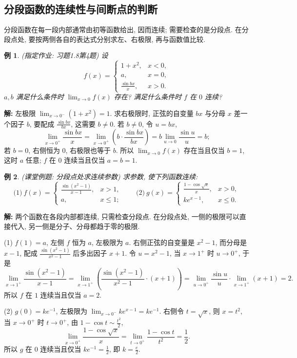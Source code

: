 \documentclass[UTF8,openany]{ctexbook}
\theoremstyle{chinesetextbook}
\newtheorem{example}{例}[section]
\newenvironment{cnsolution}{\par\indent\textbf{解:} \ignorespaces}{\par}
\begin{document}
\subsection{分段函数的连续性与间断点的判断}
分段函数在每一段内部通常由初等函数给出, 因而连续; 需要检查的是分段点. 在分段点处, 要按两侧各自的表达式分别求左、右极限, 再与函数值比较.
\begin{example}
\textnormal{(指定作业: 习题1.8第4题)} 设
\[
f(x)=\begin{cases}1+x^2,&x<0,\\a,&x=0,\\\frac{\sin bx}x,&x>0.\end{cases}
\]
$a,b$ 满足什么条件时 $\displaystyle\lim_{x\to0}f(x)$ 存在? 满足什么条件时 $f$ 在 $0$ 连续?
\end{example}
\begin{cnsolution}
左极限 $\displaystyle\lim_{x\to0^-}(1+x^2)=1$. 求右极限时, 正弦的自变量 $bx$ 与分母 $x$ 差一个因子 $b$, 要配成 $\displaystyle\frac{\sin bx}{bx}$, 这需要 $b\ne0$. 若 $b\ne0$, 令 $u=bx$,
\[
\lim_{x\to0^+}\frac{\sin bx}x=\lim_{x\to0^+}\left(b\cdot\frac{\sin bx}{bx}\right)=b\lim_{u\to0}\frac{\sin u}u=b;
\]
若 $b=0$, 右侧恒为 $0$, 右极限也等于 $b$. 所以 $\displaystyle\lim_{x\to0}f(x)$ 存在当且仅当 $b=1$, 这时 $a$ 任意; $f$ 在 $0$ 连续当且仅当 $a=b=1$.
\end{cnsolution}
\begin{example}
\textnormal{(课堂例题: 分段点处求连续参数)} 求参数, 使下列函数连续:
\[
\text{(1)}\ f(x)=\begin{cases}\frac{\sin(x^2-1)}{x-1},&x>1,\\a,&x\le1;\end{cases}\qquad\text{(2)}\ g(x)=\begin{cases}\frac{1-\cos\sqrt x}x,&x>0,\\ke^{x-1},&x\le0.\end{cases}
\]
\end{example}
\begin{cnsolution}
两个函数在各段内部都连续, 只需检查分段点. 在分段点处, 一侧的极限可以直接代入, 另一侧是分子、分母都趋于零的极限.

(1) $f(1)=a$, 左侧 $f$ 恒为 $a$, 左极限为 $a$. 右侧正弦的自变量是 $x^2-1$, 而分母是 $x-1$, 配成 $\displaystyle\frac{\sin(x^2-1)}{x^2-1}$ 后多出因子 $x+1$. 令 $u=x^2-1$, 当 $x\to1^+$ 时 $u\to0^+$, 于是
\[
\lim_{x\to1^+}\frac{\sin(x^2-1)}{x-1}=\lim_{x\to1^+}\left(\frac{\sin(x^2-1)}{x^2-1}\cdot(x+1)\right)=\lim_{u\to0^+}\frac{\sin u}u\cdot\lim_{x\to1^+}(x+1)=2.
\]
所以 $f$ 在 $1$ 连续当且仅当 $a=2$.

(2) $g(0)=ke^{-1}$, 左极限为 $\displaystyle\lim_{x\to0^-}ke^{x-1}=ke^{-1}$. 右侧令 $t=\sqrt x$, 则 $x=t^2$, 当 $x\to0^+$ 时 $t\to0^+$, 由 $\displaystyle1-\cos t\sim\frac{t^2}2$,
\[
\lim_{x\to0^+}\frac{1-\cos\sqrt x}x=\lim_{t\to0^+}\frac{1-\cos t}{t^2}=\frac12.
\]
所以 $g$ 在 $0$ 连续当且仅当 $\displaystyle ke^{-1}=\frac12$, 即 $\displaystyle k=\frac e2$.
\end{cnsolution}
\end{document}
